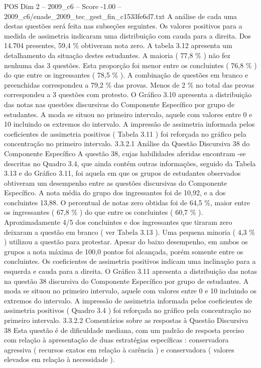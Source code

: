 \begin{textsample}{POS Dim 2 – 2009\_c6 – Score -1.00 – 2009\_c6/enade\_2009\_tec\_gest\_fin\_c1533fe6d7.txt}
A análise de cada uma destas questões será feita nas subseções seguintes.
Os valores positivos para a medida de assimetria indicaram uma distribuição com cauda para a direita.
Dos 14.704 presentes, 59,4 \% obtiveram nota zero.
A tabela 3.12 apresenta um detalhamento da situação destes estudantes.
A maioria ( 77,8 \% ) não fez nenhuma das 3 questões.
Esta proporção foi menor entre os concluintes ( 76,8 \% ) do que entre os ingressantes ( 78,5 \% ).
A combinação de questões em branco e preenchidas correspondeu a 79,2 \% das provas.
Menos de 2 \% no total das provas correspondeu a 3 questões com protesto.
O Gráfico 3.10 apresenta a distribuição das notas nas questões discursivas do Componente Específico por grupo de estudantes.
A moda se situou no primeiro intervalo, aquele com valores entre 0 e 10 incluindo os extremos do intervalo.
A impressão de assimetria informada pelos coeficientes de assimetria positivos ( Tabela 3.11 ) foi reforçada no gráfico pela concentração no primeiro intervalo. 3.3.2.1 Análise da Questão Discursiva 38 do Componente Específico A questão 38, cujas habilidades aferidas encontram -se descritas no Quadro 3.4, que ainda contém outras informações, seguido da Tabela 3.13 e do Gráfico 3.11, foi aquela em que os grupos de estudantes observados obtiveram um desempenho entre as questões discursivas do Componente Específico.
A nota média do grupo dos ingressantes foi de 10,92, e a dos concluintes 13,88.
O percentual de notas zero obtidas foi de 64,5 \%, maior entre os ingressantes ( 67,8 \% ) do que entre os concluintes ( 60,7 \% ).
Aproximadamente 4/5 dos concluintes e dos ingressantes que tiraram zero deixaram a questão em branco ( ver Tabela 3.13 ).
Uma pequena minoria ( 4,3 \% ) utilizou a questão para protestar.
Apesar do baixo desempenho, em ambos os grupos a nota máxima de 100,0 pontos foi alcançada, porém somente entre os concluintes.
Os coeficientes de assimetria positivos indicam uma inclinação para a esquerda e cauda para a direita.
O Gráfico 3.11 apresenta a distribuição das notas na questão 38 discursiva do Componente Específico por grupo de estudantes.
A moda se situou no primeiro intervalo, aquele com valores entre 0 e 10 incluindo os extremos do intervalo.
A impressão de assimetria informada pelos coeficientes de assimetria positivos ( Quadro 3.4 ) foi reforçada no gráfico pela concentração no primeiro intervalo. 3.3.2.2 Comentários sobre as respostas à Questão Discursiva 38 Esta questão é de dificuldade mediana, com um padrão de resposta preciso com relação à apresentação de duas estratégias específicas : conservadora agressiva ( recursos exatos em relação à carência ) e conservadora ( valores elevados em relação à necessidade ).

\end{textsample}
